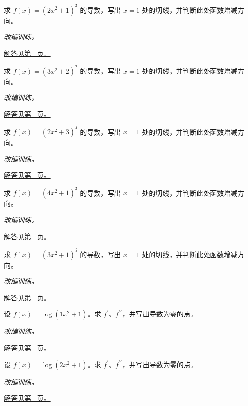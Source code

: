 \documentclass[12pt,fontset=fandol]{ctexart}
\begin{document}
\begin{example}[幂函数的链式法则]\label{ex:c8q8}
求 $f(x)=(2x^2+1)^{3}$ 的导数，写出 $x=1$ 处的切线，并判断此处函数增减方向。
\par\textit{改编训练。}\par\hyperref[ans:c8q8]{解答见第~\pageref{ans:c8q8} 页。}
\end{example}
\begin{example}[幂函数的链式法则]\label{ex:c8q9}
求 $f(x)=(3x^2+2)^{2}$ 的导数，写出 $x=1$ 处的切线，并判断此处函数增减方向。
\par\textit{改编训练。}\par\hyperref[ans:c8q9]{解答见第~\pageref{ans:c8q9} 页。}
\end{example}
\begin{example}[幂函数的链式法则]\label{ex:c8q10}
求 $f(x)=(2x^2+3)^{4}$ 的导数，写出 $x=1$ 处的切线，并判断此处函数增减方向。
\par\textit{改编训练。}\par\hyperref[ans:c8q10]{解答见第~\pageref{ans:c8q10} 页。}
\end{example}
\begin{example}[幂函数的链式法则]\label{ex:c8q11}
求 $f(x)=(4x^2+1)^{3}$ 的导数，写出 $x=1$ 处的切线，并判断此处函数增减方向。
\par\textit{改编训练。}\par\hyperref[ans:c8q11]{解答见第~\pageref{ans:c8q11} 页。}
\end{example}
\begin{example}[幂函数的链式法则]\label{ex:c8q12}
求 $f(x)=(3x^2+1)^{5}$ 的导数，写出 $x=1$ 处的切线，并判断此处函数增减方向。
\par\textit{改编训练。}\par\hyperref[ans:c8q12]{解答见第~\pageref{ans:c8q12} 页。}
\end{example}
\begin{example}[对数复合与二阶导数]\label{ex:c8q13}
设 $f(x)=\log(1x^2+1)$。求 $f^{\prime}$、$f^{\prime\prime}$，并写出导数为零的点。
\par\textit{改编训练。}\par\hyperref[ans:c8q13]{解答见第~\pageref{ans:c8q13} 页。}
\end{example}
\begin{example}[对数复合与二阶导数]\label{ex:c8q14}
设 $f(x)=\log(2x^2+1)$。求 $f^{\prime}$、$f^{\prime\prime}$，并写出导数为零的点。
\par\textit{改编训练。}\par\hyperref[ans:c8q14]{解答见第~\pageref{ans:c8q14} 页。}
\end{example}
\end{document}
